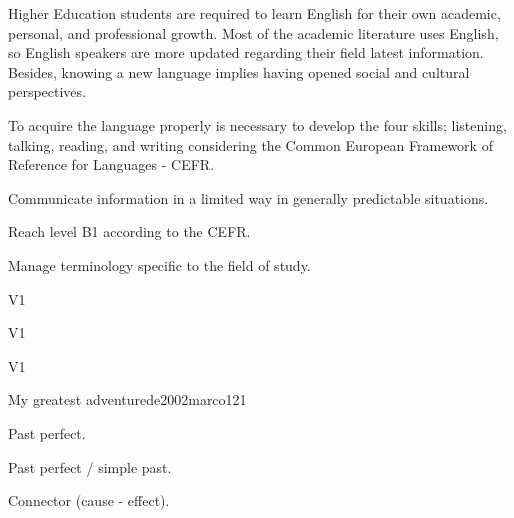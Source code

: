 \begin{syllabus}

\begin{justification}
Higher Education students are required to learn English for their own academic, 
personal, and professional growth. Most of the academic literature uses English, 
so English speakers are more updated regarding their field latest information. 
Besides, knowing a new language implies having opened social and 
cultural perspectives.  

To acquire the language properly is necessary to develop the four skills;
listening, talking, reading, and writing considering the 
Common European Framework of Reference for Languages - CEFR.
\end{justification}

\begin{goals}
\item Communicate information in a limited way in generally predictable situations.
\item Reach level B1 according to the CEFR.
\item Manage terminology specific to the field of study.
\end{goals}

\begin{outcomes}{V1}
\item {}
\end{outcomes}

\begin{specificoutcomes}{V1}
\item {}
\item {}
\item {}
\item {}
\end{specificoutcomes}

\begin{competences}{V1}
    \item {}
\end{competences}

\begin{unit}{My greatest adventure}{}{de2002marco}{12}{1}
   \begin{topics}
      \item Past perfect.
      \item Past perfect / simple past.
      \item Connector (cause - effect).
   \end{topics}


\end{unit}
\end{syllabus}
